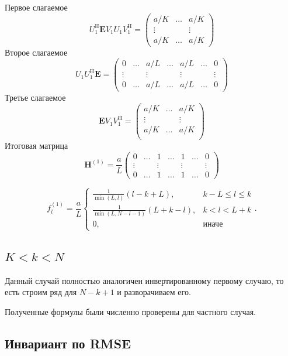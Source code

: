 \documentclass[specialist,
               substylefile = spbu.rtx,
               subf,href,colorlinks=true, 12pt]{disser}
\begin{document}
Первое слагаемое
$$U_1^{\mathrm{H}} \mathbf{E} V_1 U_1 V_1^{\mathrm{H}} = \begin{pmatrix}
	a/ K & \ldots &   a/ K\\
	\vdots & & \vdots\\
	a/ K &   \ldots &   a/ K
\end{pmatrix}$$
Второе слагаемое
$$U_1 U_1^{\mathrm{H}} \mathbf{E} = \begin{pmatrix}
	0 & \ldots & a/L & \ldots & a/L & \ldots & 0\\
	\vdots & & \vdots & & \vdots & & \vdots\\
	0 & \ldots & a/L & \ldots & a/L & \ldots & 0
\end{pmatrix}$$
Третье слагаемое
$$\mathbf{E} V_1 V_1^{\mathrm{H}} = \begin{pmatrix}
	a/K &  \ldots & a/K\\
	\vdots & & \vdots\\
	a/K &  \ldots & a/K\\
\end{pmatrix}$$
Итоговая матрица
$$\mathbf{H}^{(1)} = \frac{a}{L}\begin{pmatrix}
	0 & \ldots & 1 & \ldots & 1 & \ldots & 0\\
	\vdots & & \vdots & & \vdots & & \vdots\\
	0 & \ldots & 1 & \ldots & 1 & \ldots & 0
\end{pmatrix}$$

$$f^{(1)}_l = \frac{a}{{L}}
\begin{cases}
	\frac{1}{\min(L, l)}(l - k + L), & \text{$k - L \leq l \leq k$}\\
	\frac{1}{\min(L, N - l - 1)}(L + k - l), & \text{$k < l < L + k$}\\
	0, & \text{иначе}
\end{cases}.$$


\subsection{$K < k < N$}
Данный случай полностью аналогичен инвертированному первому случаю, то есть строим ряд для $N - k + 1$ и разворачиваем его.

\vspace{1em}
Полученные формулы были численно проверены для частного случая.

\subsection{Инвариант по RMSE} \label{ss:RMSEinv}
\end{document}
